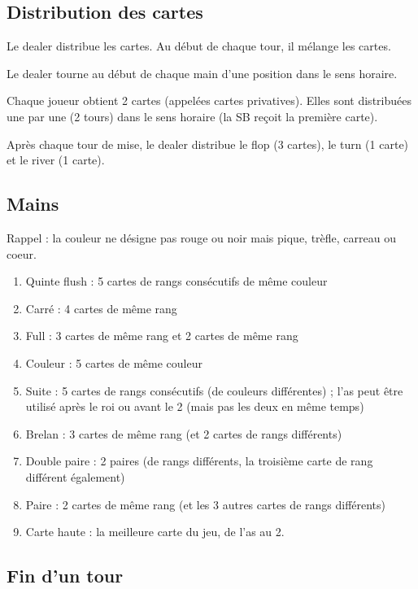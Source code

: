\subsection{Distribution des cartes}

Le dealer distribue les cartes.
Au début de chaque tour, il mélange les cartes.

Le dealer tourne au début de chaque main d'une position dans le sens horaire.

Chaque joueur obtient 2 cartes (appelées cartes privatives). Elles sont distribuées une par une (2 tours) dans le sens horaire (la SB reçoit la première carte).

Après chaque tour de mise, le dealer distribue le flop (3 cartes), le turn (1 carte) et le river (1 carte).

\subsection{Mains}

Rappel : la couleur ne désigne pas rouge ou noir mais pique, trèfle, carreau ou coeur.

\begin{enumerate}
	\item Quinte flush : 5 cartes de rangs consécutifs de même couleur
	\item Carré : 4 cartes de même rang
	\item Full : 3 cartes de même rang et 2 cartes de même rang
	\item Couleur : 5 cartes de même couleur
	\item Suite : 5 cartes de rangs consécutifs (de couleurs différentes) ; l'as peut être utilisé après le roi ou avant le 2 (mais pas les deux en même temps)
	\item Brelan : 3 cartes de même rang (et 2 cartes de rangs différents)
	\item Double paire : 2 paires (de rangs différents, la troisième carte de rang différent également)
	\item Paire : 2 cartes de même rang (et les 3 autres cartes de rangs différents)
	\item Carte haute : la meilleure carte du jeu, de l'as au 2.
\end{enumerate}

\subsection{Fin d'un tour}

